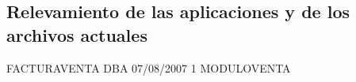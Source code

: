 \subsection{Relevamiento de las aplicaciones y de los archivos actuales}

\begin{apx5}
{FACTURAVENTA}
{DBA}
{07/08/2007}
{1}
{MODULOVENTA}
\end{apx5}

